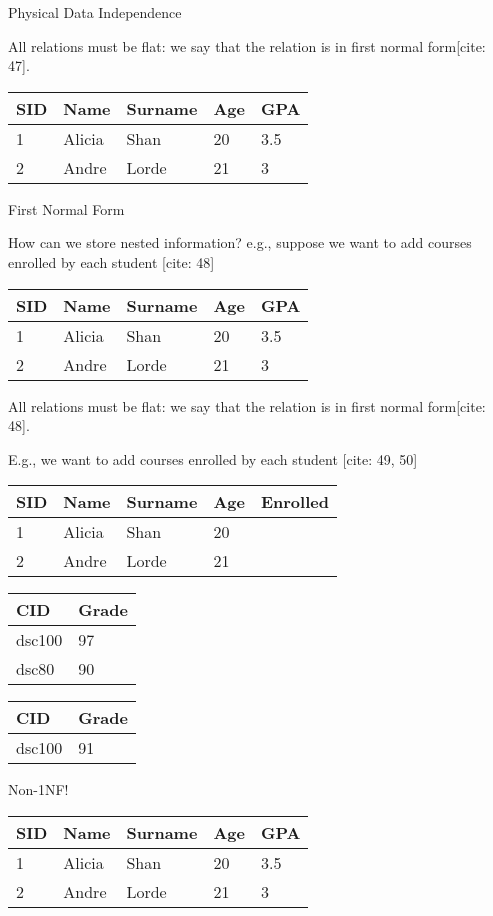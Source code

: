 \documentclass{article}
\begin{document}
Physical Data Independence

All relations must be flat: we say that the relation is in first normal form[cite: 47].

\begin{tabular}{lllll}
\hline
SID & Name & Surname & Age & GPA \\
\hline
1 & Alicia & Shan & 20 & 3.5 \\
2 & Andre & Lorde & 21 & 3 \\
\hline
\end{tabular}

First Normal Form

How can we store nested information? e.g., suppose we want to add courses enrolled by each student [cite: 48]

\begin{tabular}{lllll}
\hline
SID & Name & Surname & Age & GPA \\
\hline
1 & Alicia & Shan & 20 & 3.5 \\
2 & Andre & Lorde & 21 & 3 \\
\hline
\end{tabular}

All relations must be flat: we say that the relation is in first normal form[cite: 48].

E.g., we want to add courses enrolled by each student [cite: 49, 50]

\begin{tabular}{lllll}
\hline
SID & Name & Surname & Age & Enrolled \\
\hline
1 & Alicia & Shan & 20 &  \\
2 & Andre & Lorde & 21 &  \\
\hline
\end{tabular}

\begin{tabular}{ll}
\hline
CID & Grade \\
\hline
dsc100 & 97 \\
dsc80 & 90 \\
\hline
\end{tabular}

\begin{tabular}{ll}
\hline
CID & Grade \\
\hline
dsc100 & 91 \\
\hline
\end{tabular}

Non-1NF!

\begin{tabular}{lllll}
\hline
SID & Name & Surname & Age & GPA \\
\hline
1 & Alicia & Shan & 20 & 3.5 \\
2 & Andre & Lorde & 21 & 3 \\
\hline
\end{tabular}
\end{document}
